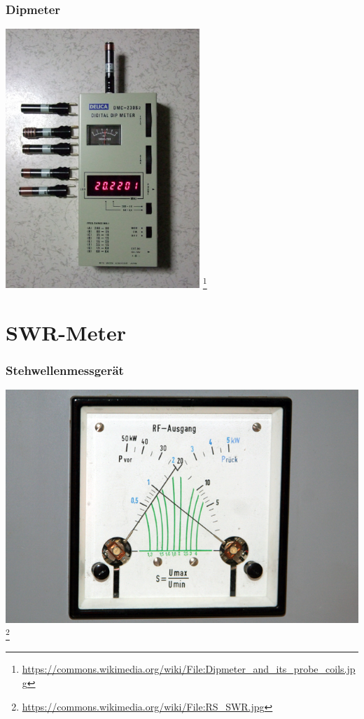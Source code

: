\begin{frame}
    \frametitle{Dipmeter}
    \begin{center}
        \includegraphics[width=0.55\textwidth,height=.8\textheight,keepaspectratio]{e17/Dipmeter.jpg}
        \footnote{\tiny \url{https://commons.wikimedia.org/wiki/File:Dipmeter_and_its_probe_coils.jpg}}
	\end{center}
\end{frame}

\section*{SWR-Meter}

\begin{frame}
    \frametitle{Stehwellenmessgerät}
    \begin{center}
        \includegraphics[width=1\textwidth,height=.8\textheight,keepaspectratio]{e17/RS_SWR.jpg}
        \footnote{\tiny \url{https://commons.wikimedia.org/wiki/File:RS_SWR.jpg}}
	\end{center}
\end{frame}

